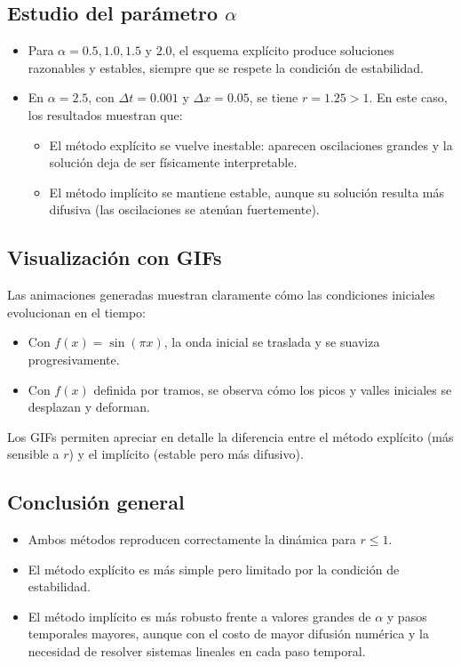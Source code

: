 \documentclass[12pt,a4paper]{article}
\begin{document}
\subsection*{Estudio del parámetro $\alpha$}
\begin{itemize}
    \item Para $\alpha = 0.5, 1.0, 1.5$ y $2.0$, el esquema explícito produce soluciones razonables y estables, siempre que se respete la condición de estabilidad.
    \item En $\alpha=2.5$, con $\Delta t=0.001$ y $\Delta x=0.05$, se tiene $r=1.25>1$. En este caso, los resultados muestran que:
    \begin{itemize}
        \item El método explícito se vuelve inestable: aparecen oscilaciones grandes y la solución deja de ser físicamente interpretable.
        \item El método implícito se mantiene estable, aunque su solución resulta más difusiva (las oscilaciones se atenúan fuertemente).
    \end{itemize}
\end{itemize}

\subsection*{Visualización con GIFs}
Las animaciones generadas muestran claramente cómo las condiciones iniciales evolucionan en el tiempo:
\begin{itemize}
    \item Con $f(x)=\sin(\pi x)$, la onda inicial se traslada y se suaviza progresivamente.
    \item Con $f(x)$ definida por tramos, se observa cómo los picos y valles iniciales se desplazan y deforman.
\end{itemize}
Los GIFs permiten apreciar en detalle la diferencia entre el método explícito (más sensible a $r$) y el implícito (estable pero más difusivo).

\subsection*{Conclusión general}
\begin{itemize}
    \item Ambos métodos reproducen correctamente la dinámica para $r \leq 1$.
    \item El método explícito es más simple pero limitado por la condición de estabilidad.
    \item El método implícito es más robusto frente a valores grandes de $\alpha$ y pasos temporales mayores, aunque con el costo de mayor difusión numérica y la necesidad de resolver sistemas lineales en cada paso temporal.
\end{itemize}
\end{document}

